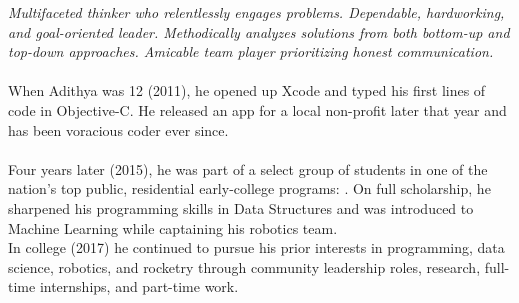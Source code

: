 
\begin{multicols}{2}  %
	\noindent
	\emph{Multifaceted thinker who relentlessly engages problems.
		Dependable, hardworking, and goal-oriented leader.
		Methodically analyzes solutions from both bottom-up and top-down approaches. Amicable team player prioritizing honest communication.
	}
	\\
	\\
	When Adithya was 12 (2011), he opened up Xcode and typed his first lines of code in Objective-C.
	He released an  app for a local non-profit later that year and has been voracious coder ever since.\\ \\

	Four years later (2015), he was part of a select group of students in one of the nation's top public, residential early-college programs: .
	On full scholarship, he sharpened his programming skills in Data Structures and was introduced to Machine Learning while captaining his robotics team.\\

	In college (2017) he continued to pursue his prior interests in programming, data science, robotics, and rocketry through community leadership roles, research, full-time internships, and part-time work.
\end{multicols}\spacedhrule{0em}{-0.4em}